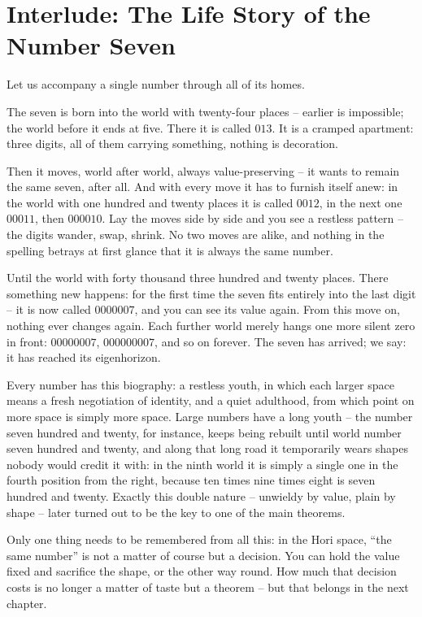 \chapter*{Interlude: The Life Story of the Number Seven}

\begin{oberflaeche}
Let us accompany a single number through all of its homes.

The seven is born into the world with twenty-four places -- earlier
is impossible; the world before it ends at five. There it is called
$013$. It is a cramped apartment: three digits, all of them
carrying something, nothing is decoration.

Then it moves, world after world, always value-preserving -- it
wants to remain the same seven, after all. And with every move it
has to furnish itself anew: in the world with one hundred and
twenty places it is called $0012$, in the next one $00011$, then
$000010$. Lay the moves side by side and you see a restless
pattern -- the digits wander, swap, shrink. No two moves are alike,
and nothing in the spelling betrays at first glance that it is
always the same number.

Until the world with forty thousand three hundred and twenty
places. There something new happens: for the first time the seven
fits entirely into the last digit -- it is now called $0000007$,
and you can see its value again. From this move on, nothing ever
changes again. Each further world merely hangs one more silent zero
in front: $00000007$, $000000007$, and so on forever. The seven has
arrived; we say: it has reached its eigenhorizon.

Every number has this biography: a restless youth, in which each
larger space means a fresh negotiation of identity, and a quiet
adulthood, from which point on more space is simply more space.
Large numbers have a long youth -- the number seven hundred and
twenty, for instance, keeps being rebuilt until world number seven
hundred and twenty, and along that long road it temporarily wears
shapes nobody would credit it with: in the ninth world it is simply
a single one in the fourth position from the right, because ten
times nine times eight is seven hundred and twenty. Exactly this
double nature -- unwieldy by value, plain by shape -- later turned
out to be the key to one of the main theorems.

Only one thing needs to be remembered from all this: in the Hori
space, ``the same number'' is not a matter of course but a
decision. You can hold the value fixed and sacrifice the shape, or
the other way round. How much that decision costs is no longer a
matter of taste but a theorem -- but that belongs in the next
chapter.
\end{oberflaeche}
